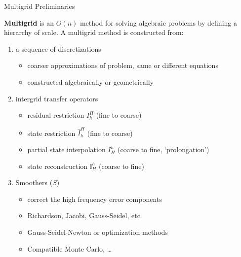 \documentclass{beamer}
\begin{document}
\begin{frame}[fragile]{Multigrid Preliminaries}
\begin{figure}
    \label{fig:levels}
  \end{figure}
  \textbf{Multigrid} is an $O(n)$ method for solving algebraic problems by defining a hierarchy of scale.
  A multigrid method is constructed from:
  \begin{enumerate}
  \item a sequence of discretizations
    \begin{itemize}
    \item coarser approximations of problem, same or different equations
    \item constructed algebraically or geometrically
    \end{itemize}
  \item intergrid transfer operators
    \begin{itemize}
    \item residual restriction $I_h^H$ (fine to coarse)
    \item state restriction $\hat I_h^H$ (fine to coarse)
    \item partial state interpolation $I_H^h$ (coarse to fine, `prolongation')
    \item state reconstruction $\mathbb{I}_H^h$ (coarse to fine)
    \end{itemize}
  \item Smoothers ($S$)
    \begin{itemize}
    \item correct the high frequency error components
    \item Richardson, Jacobi, Gauss-Seidel, etc.
    \item Gauss-Seidel-Newton or optimization methods
    \item Compatible Monte Carlo, \ldots
    \end{itemize}
  \end{enumerate}
\end{frame}

\end{document}
